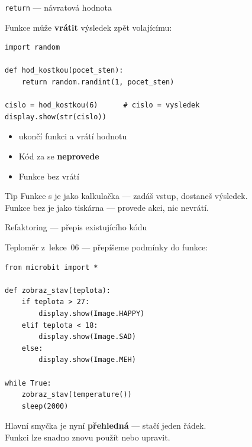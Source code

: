 \begin{frame}[fragile]{\texttt{return} — návratová hodnota}

  Funkce může \textbf{vrátit} výsledek zpět volajícímu:

  \bigskip
  \begin{lstlisting}
import random

def hod_kostkou(pocet_sten):
    return random.randint(1, pocet_sten)

cislo = hod_kostkou(6)      # cislo = vysledek
display.show(str(cislo))
  \end{lstlisting}

  \bigskip
  \begin{itemize}
    \item {} ukončí funkci a vrátí hodnotu
    \item Kód za  se \textbf{neprovede}
    \item Funkce bez  vrátí 
  \end{itemize}

  \pause\bigskip
  \begin{exampleblock}{Tip}
    Funkce s  je jako kalkulačka — zadáš vstup, dostaneš výsledek.\\
    Funkce bez  je jako tiskárna — provede akci, nic nevrátí.
  \end{exampleblock}
\end{frame}

\begin{frame}[fragile]{Refaktoring — přepis existujícího kódu}

  Teploměr z~lekce~06 — přepíšeme podmínky do funkce:

  \bigskip
  \begin{lstlisting}
from microbit import *

def zobraz_stav(teplota):
    if teplota > 27:
        display.show(Image.HAPPY)
    elif teplota < 18:
        display.show(Image.SAD)
    else:
        display.show(Image.MEH)

while True:
    zobraz_stav(temperature())
    sleep(2000)
  \end{lstlisting}

  \bigskip
  Hlavní smyčka je nyní \textbf{přehledná} — stačí jeden řádek.\\
  Funkci  lze snadno znovu použít nebo upravit.
\end{frame}

